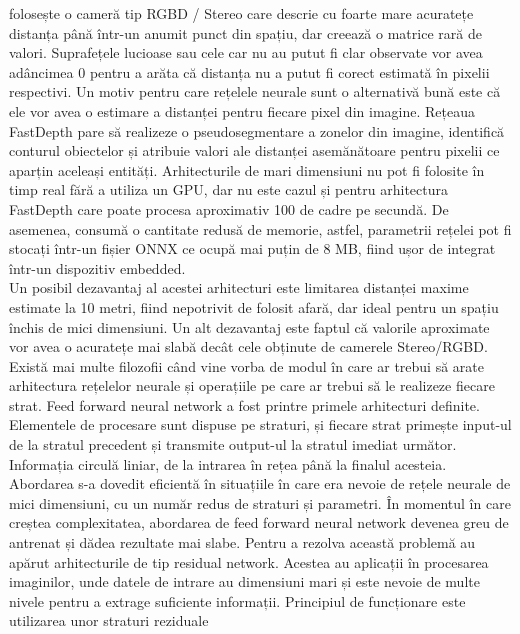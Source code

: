 \documentclass[12pt,a4paper]{report}
\begin{document}
folosește o cameră tip RGBD / Stereo care descrie cu foarte mare acuratețe distanța până într-un
anumit punct din spațiu, dar creează o matrice rară de valori. Suprafețele lucioase sau 
cele car nu au putut fi clar observate vor avea adâncimea 0 pentru a arăta că distanța nu a putut 
fi corect estimată în pixelii respectivi. Un motiv pentru care rețelele
neurale sunt o alternativă bună este că ele vor avea o estimare a distanței pentru fiecare pixel din imagine.
Rețeaua FastDepth pare să realizeze o pseudosegmentare a zonelor din imagine, identifică
conturul obiectelor și atribuie valori ale distanței asemănătoare pentru pixelii ce aparțin aceleași
entități. Arhitecturile de mari dimensiuni nu pot fi folosite în timp real 
fără a utiliza un GPU, dar nu este cazul și pentru arhitectura FastDepth care poate procesa 
aproximativ 100 de cadre pe secundă. De asemenea, consumă o cantitate redusă de memorie, astfel,  
parametrii rețelei pot fi stocați într-un fișier ONNX ce ocupă mai puțin de 8 MB, fiind ușor
de integrat într-un dispozitiv embedded. \\
Un posibil dezavantaj al acestei arhitecturi este limitarea distanței maxime estimate la 10 metri, fiind nepotrivit
de folosit afară, dar ideal pentru un spațiu închis de mici dimensiuni. Un alt dezavantaj
este faptul că valorile aproximate vor avea o acuratețe mai slabă decât cele obținute de camerele
Stereo/RGBD.\\
Există mai multe filozofii când vine vorba de modul în care ar trebui să
arate arhitectura rețelelor neurale și operațiile pe care ar trebui să le realizeze
fiecare strat. Feed forward neural network a fost printre primele arhitecturi definite. 
Elementele de procesare sunt dispuse pe straturi, și fiecare strat primește input-ul de la stratul 
precedent și transmite output-ul la stratul imediat următor. Informația circulă liniar, de la 
intrarea în rețea până la finalul acesteia. Abordarea s-a dovedit eficientă în situațiile 
în care era nevoie de rețele neurale de mici dimensiuni, cu un număr redus de straturi și 
parametri. În momentul în care creștea complexitatea, abordarea de feed forward neural network 
devenea greu de antrenat și dădea rezultate mai slabe\cite{GURESEN2011426}. Pentru a rezolva această problemă 
au apărut arhitecturile de tip residual network. Acestea au aplicații în procesarea imaginilor\cite{he2015deepresiduallearningimage},
unde datele de intrare au dimensiuni mari și este nevoie de multe nivele pentru a extrage
suficiente informații. Principiul de funcționare este utilizarea unor straturi reziduale 
\end{document}
